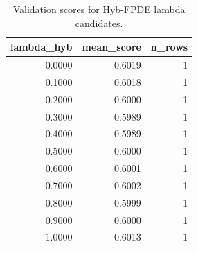 \begin{table}[t]
\caption{Validation scores for Hyb-FPDE lambda candidates.}
\label{tab:lambda_distribution_computed}
\centering
\begin{tabular}{rrr}
\toprule
lambda\_hyb & mean\_score & n\_rows \\
\midrule
0.0000 & 0.6019 & 1 \\
0.1000 & 0.6018 & 1 \\
0.2000 & 0.6000 & 1 \\
0.3000 & 0.5989 & 1 \\
0.4000 & 0.5989 & 1 \\
0.5000 & 0.6000 & 1 \\
0.6000 & 0.6001 & 1 \\
0.7000 & 0.6002 & 1 \\
0.8000 & 0.5999 & 1 \\
0.9000 & 0.6000 & 1 \\
1.0000 & 0.6013 & 1 \\
\bottomrule
\end{tabular}

\end{table}

